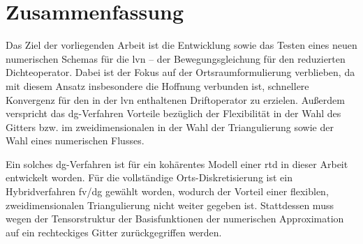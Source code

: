 \chapter{Zusammenfassung}
Das Ziel der vorliegenden Arbeit ist die Entwicklung sowie das Testen eines neuen numerischen Schemas für die \ac{lvn} -- der Bewegungsgleichung für den reduzierten Dichteoperator. Dabei ist der Fokus auf der Ortsraumformulierung verblieben, da mit diesem Ansatz insbesondere die Hoffnung verbunden ist, schnellere Konvergenz für den in der \ac{lvn} enthaltenen Driftoperator zu erzielen. Außerdem verspricht das \ac{dg}-Verfahren Vorteile bezüglich der Flexibilität in der Wahl des Gitters bzw. im zweidimensionalen in der Wahl der Triangulierung sowie der Wahl eines numerischen Flusses.

Ein solches \ac{dg}-Verfahren ist für ein kohärentes Modell einer \ac{rtd} in dieser Arbeit entwickelt worden. Für die vollständige Orts-Diskretisierung ist ein Hybridverfahren \ac{fv}/\ac{dg} gewählt worden, wodurch der Vorteil einer flexiblen, zweidimensionalen Triangulierung nicht weiter gegeben ist. Stattdessen muss wegen der Tensorstruktur der Basisfunktionen der numerischen Approximation auf ein rechteckiges Gitter zurückgegriffen werden.

